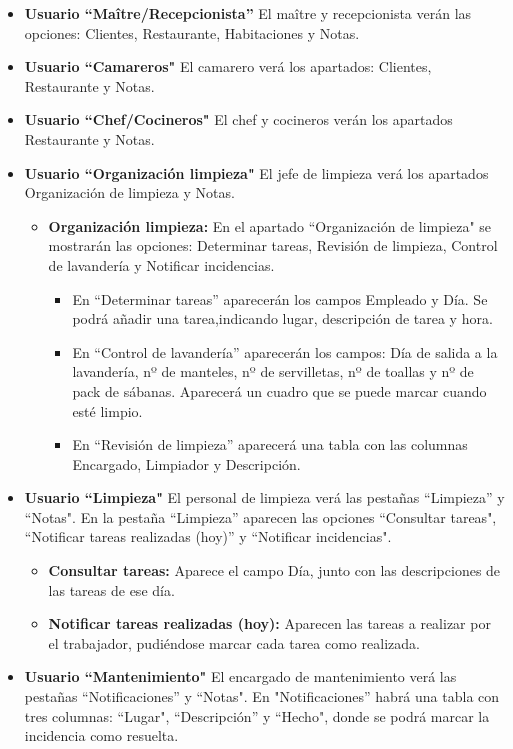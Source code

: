 \documentclass[spanish,a4paper,11pt, twoside]{report}	%
\begin{document}
\begin{itemize}
				 \item \textbf{Usuario “Maître/Recepcionista'' } El maître y recepcionista verán las opciones: Clientes, Restaurante, Habitaciones y Notas. 
				 \item \textbf{Usuario “Camareros" } El camarero verá los apartados: Clientes, Restaurante y Notas. 	
				 \item \textbf{Usuario “Chef/Cocineros" } El chef y cocineros verán los apartados Restaurante y Notas. 
				 \item \textbf{Usuario “Organización limpieza" } El jefe de limpieza verá los apartados Organización de limpieza y Notas. 
					\begin{itemize}
						 \item \textbf{Organización limpieza: }En el apartado “Organización de limpieza" se mostrarán las opciones: Determinar tareas, Revisión de limpieza, Control de lavandería y Notificar incidencias. 
						 \begin{itemize}
							\item En “Determinar tareas'' aparecerán los campos Empleado y Día. Se podrá añadir una tarea,indicando lugar, descripción de tarea y hora.
							\item En “Control de lavandería'' aparecerán los campos: Día de salida a la lavandería, nº de manteles, nº de servilletas, nº de toallas y nº de pack de sábanas. Aparecerá un cuadro que se puede marcar cuando esté limpio. 
							\item En “Revisión de limpieza'' aparecerá una tabla con las columnas Encargado, Limpiador y Descripción.	
						\end{itemize}
					\end{itemize}
				 \item \textbf{Usuario “Limpieza" }El personal de limpieza verá las pestañas “Limpieza'' y “Notas". En la pestaña “Limpieza'' aparecen las opciones “Consultar tareas", “Notificar tareas realizadas (hoy)'' y “Notificar incidencias".
					\begin{itemize}
						\item \textbf{Consultar tareas:} Aparece el campo Día, junto con las descripciones de las tareas de ese día. 
						 \item \textbf{Notificar tareas realizadas (hoy): }Aparecen las tareas a realizar por el trabajador, pudiéndose marcar cada tarea como realizada. 
					\end{itemize}
				 \item \textbf{Usuario “Mantenimiento" } El encargado de mantenimiento verá las pestañas “Notificaciones'' y “Notas". En "Notificaciones'' habrá una tabla con tres columnas: “Lugar", “Descripción'' y “Hecho", donde se podrá marcar la incidencia como resuelta. 
			\end{itemize}
\end{document}
